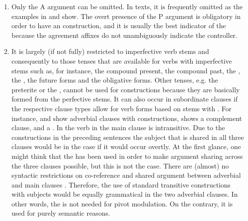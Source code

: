 \begin{enumerate}
	\item	Only the A argument can be omitted. In texts, it is frequently omitted as the examples in  and  show. The overt presence of the P argument is obligatory in order to have an  construction, and it is usually the best indicator of the  because the  agreement affixes do not unambiguously indicate the controller.

	\item	It is largely (if not fully) restricted to imperfective verb stems and consequently to those tenses that are available for verbs with imperfective stems such as, for instance, the compound present, the compound past, the , the , the future forms and the obligative forms. Other tenses, e.g. the preterite or the , cannot be used for  constructions because they are basically formed from the perfective stems. It can also occur in subordinate clauses if the respective clause types allow for verb forms based on stems with . For instance,  and  show adverbial clauses with  constructions,  shows a complement clause, and   a . In  the verb in the main clause is intransitive. Due to the  constructions in the preceding sentences the subject that is shared in all three clauses would be in the  case if it would occur overtly. At the first glance, one might think that the  has been used in order to make argument sharing across the three clauses possible, but this is not the case. There are (almost) no syntactic restrictions on co-reference and shared argument between adverbial and main clauses . Therefore, the use of standard transitive constructions with  subjects would be equally grammatical in the two adverbial clauses. In other words, the  is not needed for pivot modulation. On the contrary, it is used for purely semantic reasons. 
	\begin{exe}
		

\end{exe}
\end{enumerate}
